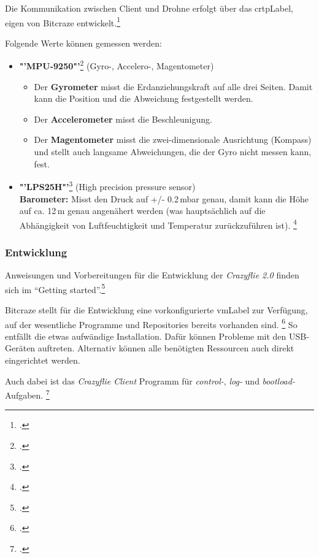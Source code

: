 Die Kommunikation zwischen Client und Drohne erfolgt über das \gls{crtpLabel}, eigen von Bitcraze entwickelt.\footcite{doc_crazyflie_crtp_index_Bitcraze_Wiki_2015-03-30}

Folgende Werte können gemessen werden:
\begin{itemize}
	\item \textbf{"'MPU-9250"'}\footcite{MEMS_Gyro-Accel_Gyroscope_Accelerometer_Processing_-_MPU-9250_Nine-Axis_2015-03-30} (Gyro-, Accelero-, Magentometer)
	\begin{itemize}
		\item Der \textbf{Gyrometer} misst die Erdanziehungskraft auf alle drei Seiten. Damit kann die Position und die Abweichung festgestellt werden.
		\item Der \textbf{Accelerometer} misst die Beschleunigung.
		\item Der \textbf{Magentometer} misst die zwei-dimensionale Ausrichtung (Kompass) und stellt auch langsame Abweichungen, die der Gyro nicht messen kann, fest.
	\end{itemize}
	\item \textbf{"'LPS25H"'}\footcite{Class-Leading_Miniature_Pressure_Sensor_from_STMicroelectronics_Powers_New_Chapter_in_Mobile_Innovation_2015-03-30} (High precision pressure sensor)\\
	\textbf{Barometer:} Misst den Druck auf +/- 0.2\,mbar genau, damit kann die Höhe auf ca. 12\,m genau angenähert werden (was hauptsächlich auf die Abhängigkeit von Luftfeuchtigkeit und Temperatur zurückzuführen ist).
	\footcite{Barometrische_Hoehenformel__Wikipedia_2015-03-30}
\end{itemize}

\subsubsection{Entwicklung}
Anweisungen und Vorbereitungen für die Entwicklung der \textit{Crazyflie 2.0} finden sich im "`Getting started"'.\footcite{doc_crazyflie_dev:starting_Bitcraze_Wiki_2015-03-29}

Bitcraze stellt für die Entwicklung eine vorkonfigurierte \gls{vmLabel} zur Verfügung, auf der wesentliche Programme und Repositories bereits vorhanden sind.
\footcite{projects_virtualmachine_index_Bitcraze_Wiki_2015-03-30}
So entfällt die etwas aufwändige Installation. Dafür können Probleme mit den USB-Geräten auftreten. Alternativ können alle benötigten Ressourcen auch direkt eingerichtet werden.

Auch dabei ist das \textit{Crazyflie Client} Programm für \textit{control-}, \textit{log-} und \textit{bootload-}Aufgaben.
\footcite{doc_crazyflie_client_pycfclient_index_Bitcraze_Wiki_2015-03-30}

